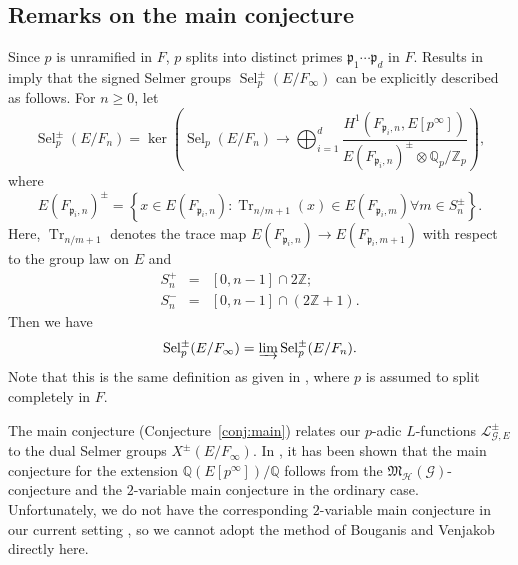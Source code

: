 \documentclass{amsart}
\begin{document}
\subsection{Remarks on the main conjecture}
Since $p$ is unramified in $F$, $p$ splits into distinct primes ${\mathfrak{p}}_1\cdots{\mathfrak{p}}_d$ in $F$. Results in \cite[\S4]{leizerbes11}  imply that the signed Selmer groups $\operatorname{Sel}_p^\pm(E/F_{\infty})$ can be explicitly described as follows. For $n\ge0$, let
\[
\operatorname{Sel}_p^\pm(E/F_n)=\ker\left(\operatorname{Sel}_p(E/F_n)\rightarrow\bigoplus_{i=1}^d\frac{H^1(F_{{\mathfrak{p}}_i,n},E[p^\infty])}{E(F_{{\mathfrak{p}}_i,n})^\pm\otimes{{\mathbb Q}_p}/{{\mathbb Z}_p}}\right),
\]
where
\[
E(F_{{\mathfrak{p}}_i,n})^\pm=\left\{x\in E(F_{{\mathfrak{p}}_i,n}):\operatorname{Tr}_{n/m+1}(x)\in E(F_{{\mathfrak{p}}_i,m}) \forall m\in S_n^\pm\right\}.
\]
Here, $\operatorname{Tr}_{n/m+1}$ denotes the trace map $E(F_{{\mathfrak{p}}_i,n})\rightarrow E(F_{{\mathfrak{p}}_i,m+1})$ with respect to the group law on $E$ and
\begin{eqnarray*}
S_n^+&=&[0,n-1]\cap2{\mathbb Z};\\
S_n^-&=&[0,n-1]\cap(2{\mathbb Z}+1).
\end{eqnarray*}
Then we have
\[
\operatorname{Sel}_p^\pm(E/F_{\infty})=\varinjlim\operatorname{Sel}^\pm_p(E/F_n).
\]
Note that this is the same definition as given in \cite{kimparkzhang}, where $p$ is assumed to split completely in $F$.

The main conjecture (Conjecture~\ref{conj:main}) relates our $p$-adic $L$-functions ${\mathcal{L}}^\pm_{{\mathcal{G}},E}$ to the dual Selmer groups $X^\pm(E/F_\infty)$. In \cite[\S2]{bv10}, it has been shown that the main conjecture for the extension ${\mathbb Q}(E[p^\infty])/{\mathbb Q}$ follows from the ${\mathfrak{M}_{\mathcal{H}}({\mathcal{G}})}$-conjecture and the $2$-variable main conjecture in the ordinary case. Unfortunately, we do not have the corresponding $2$-variable main conjecture in our current setting
, so we cannot adopt the method of Bouganis and Venjakob directly here.



\end{document}
